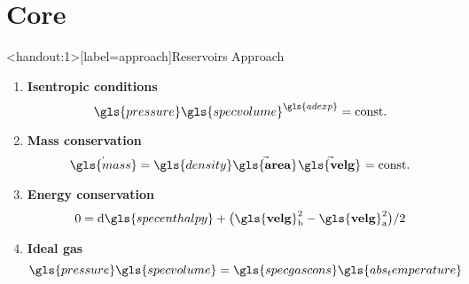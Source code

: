 \documentclass[compress, english]{beamer}%
\begin{document}
\section{Core}
\begin{frame}<handout:1>[label=approach]{Reservoirs Approach}
\begin{minipage}[c]{0.45\textwidth}
\begin{figure}
	\def\svgwidth{1\linewidth}
	
\end{figure}
\end{minipage}
\pause
\hspace*{\fill}
\begin{minipage}[c]{0.45\textwidth}
\begin{enumerate}
\item \textbf{Isentropic conditions}
\begin{equation*}
\gls{pressure}\gls{specvolume}^{\gls{adexp}} = \text{\const{}}
\end{equation*}
\item \textbf{Mass conservation}
\begin{equation*}
\dot{\gls{mass}} = \gls{density} \vect{\gls{area}}{} \vect{\gls{velg}}{} = \text{\const{}}
\end{equation*}
\item \textbf{Energy conservation}
\begin{equation*}
0 = \dd{\gls{specenthalpy}} + \big(\vectcomp{\gls{velg}}{b}{}^2 - \vectcomp{\gls{velg}}{a}{}^2\big) / 2
\end{equation*}
\item \textbf{Ideal gas}
\begin{equation*}
\gls{pressure}\gls{specvolume} = \gls{specgascons}\gls{abs_temperature}
\end{equation*}
\end{enumerate}
\end{minipage}
\end{frame}
\end{document}
